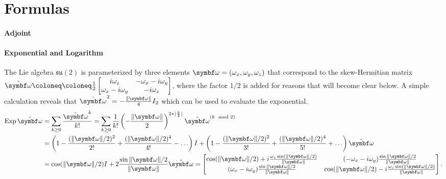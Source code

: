 \section{Formulas}

\paragraph{Adjoint}

\paragraph{Exponential and Logarithm}

The Lie algebra $\mathfrak{su}(2)$ is parameterized by three elements $\bomega = (\omega_x, \omega_y, \omega_z)$ that correspond to the skew-Hermitian matrix $\hat \bomega \coloneq \coloneq \frac{1}{{2}} \begin{bmatrix}
    i \omega_z            & -\omega_x - i \omega_y \\
    \omega_x - i \omega_y & -i \omega_z
  \end{bmatrix}$, where the factor $1/2$ is added for reasons that will become clear below. A simple calculation reveals that $\hat \bomega^2 =  -\frac{\| \bomega \|}{4} I_2$ which can be used to evaluate the exponential.
\begin{equation*}
  \begin{aligned}
    \Exp \hat \bomega
     & = \sum_{k \geq 0} \frac{\hat \bomega^k}{k!} = \sum_{k \geq 0} \frac{1}{k!} \left(-\frac{\| \bomega \|}{2} \right)^{2 * \lfloor \frac{k}{2} \rfloor} \hat \bomega^{(k \mod 2)}                      \\
     & = \left( 1 - \frac{(\|\bomega\|/2)^2}{2!} + \frac{(\|\bomega\|/2)^4}{4!} - \ldots \right) I + \left( 1 - \frac{(\|\bomega\|/2)^2}{3!} + \frac{(\|\bomega\|/2)^4}{5!} + \ldots \right) \hat \bomega \\
     & = \cos (\|\bomega\| / 2) I + 2 \frac{\sin \|\bomega\| / 2}{\|\bomega\|} \hat \bomega = \begin{bmatrix}
      \cos(\|\bomega\| / 2) + i \frac{\omega_z \sin (\|\bomega\|/2) }{\|\bomega\|} & (-\omega_x - i \omega_y) \frac{\sin \|\bomega\|/2}{\|\bomega\|}              \\
      (\omega_x - i \omega_y) \frac{\sin \|\bomega\|/2}{\|\bomega\|}               & \cos(\|\bomega\| / 2) - i \frac{\omega_z \sin (\|\bomega\|/2) }{\|\bomega\|}
    \end{bmatrix}.
  \end{aligned}
\end{equation*}
